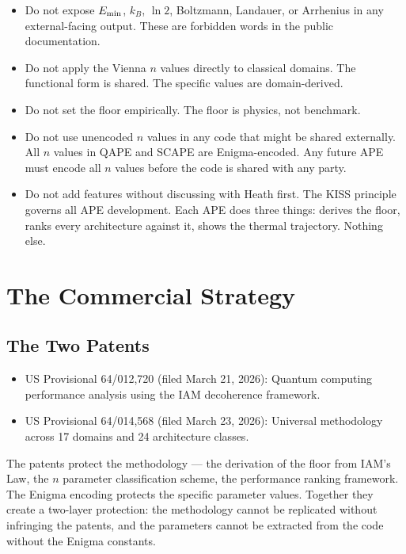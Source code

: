 \documentclass[12pt,a4paper]{article}
\begin{document}
\begin{itemize}
\item Do not expose $E_{\rm min}$, $k_B$, $\ln 2$, Boltzmann, Landauer, or
  Arrhenius in any external-facing output. These are forbidden words in the
  public documentation.

\item Do not apply the Vienna $n$ values directly to classical domains. The
  functional form is shared. The specific values are domain-derived.

\item Do not set the floor empirically. The floor is physics, not benchmark.

\item Do not use unencoded $n$ values in any code that might be shared externally.
  All $n$ values in QAPE and SCAPE are Enigma-encoded. Any future APE must
  encode all $n$ values before the code is shared with any party.

\item Do not add features without discussing with Heath first. The KISS
  principle governs all APE development. Each APE does three things: derives
  the floor, ranks every architecture against it, shows the thermal trajectory.
  Nothing else.
\end{itemize}

\newpage

\section{The Commercial Strategy}

\subsection{The Two Patents}

\begin{itemize}
\item US Provisional 64/012,720 (filed March 21, 2026): Quantum computing
  performance analysis using the IAM decoherence framework.

\item US Provisional 64/014,568 (filed March 23, 2026): Universal methodology
  across 17 domains and 24 architecture classes.
\end{itemize}

The patents protect the methodology --- the derivation of the floor from IAM's
Law, the $n$ parameter classification scheme, the performance ranking framework.
The Enigma encoding protects the specific parameter values. Together they create
a two-layer protection: the methodology cannot be replicated without infringing
the patents, and the parameters cannot be extracted from the code without the
Enigma constants.
\end{document}
